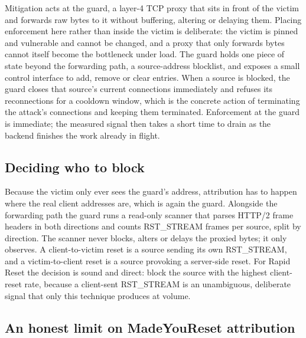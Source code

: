 \documentclass[a4paper,fleqn]{cas-dc}
\begin{document}
Mitigation acts at the guard, a layer-4 TCP proxy that sits in front of the victim and forwards raw bytes to it without buffering, altering or delaying them. Placing enforcement here rather than inside the victim is deliberate: the victim is pinned and vulnerable and cannot be changed, and a proxy that only forwards bytes cannot itself become the bottleneck under load. The guard holds one piece of state beyond the forwarding path, a source-address blocklist, and exposes a small control interface to add, remove or clear entries. When a source is blocked, the guard closes that source's current connections immediately and refuses its reconnections for a cooldown window, which is the concrete action of terminating the attack's connections and keeping them terminated. Enforcement at the guard is immediate; the measured signal then takes a short time to drain as the backend finishes the work already in flight.

\subsection{Deciding who to block}\label{sec:attribution}

Because the victim only ever sees the guard's address, attribution has to happen where the real client addresses are, which is again the guard. Alongside the forwarding path the guard runs a read-only scanner that parses HTTP/2 frame headers in both directions and counts RST\_STREAM frames per source, split by direction. The scanner never blocks, alters or delays the proxied bytes; it only observes. A client-to-victim reset is a source sending its own RST\_STREAM, and a victim-to-client reset is a source provoking a server-side reset. For Rapid Reset the decision is sound and direct: block the source with the highest client-reset rate, because a client-sent RST\_STREAM is an unambiguous, deliberate signal that only this technique produces at volume.


\subsection{An honest limit on MadeYouReset attribution}\label{sec:attribution-limit}
\end{document}
